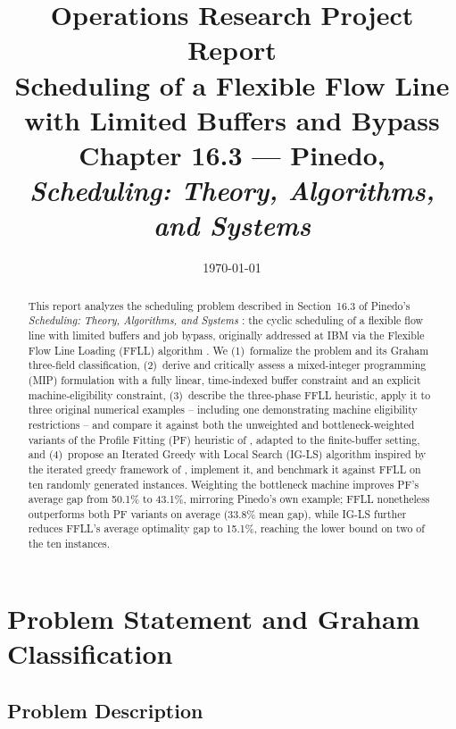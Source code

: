 \documentclass[11pt,a4paper]{article}
\title{\vspace{-1.5cm}
  {\color{steel}\Large Operations Research Project Report}\\[0.4cm]
  {\color{navy}\Huge\bfseries Scheduling of a Flexible Flow Line\\ with Limited Buffers and Bypass}\\[0.3cm]
  {\large Chapter 16.3 --- Pinedo, \textit{Scheduling: Theory, Algorithms, and Systems}}
}
\author{}
\date{\today}
\begin{document}
\maketitle
\thispagestyle{empty}

\begin{abstract}
\noindent
This report analyzes the scheduling problem described in Section~16.3 of
Pinedo's \textit{Scheduling: Theory, Algorithms, and Systems}
\citep{pinedo2016scheduling}: the cyclic scheduling of a flexible flow
line with limited buffers and job bypass, originally addressed at IBM via
the Flexible Flow Line Loading (FFLL) algorithm \citep{ibm_ffll}. We
(1)~formalize the problem and its Graham three-field classification,
(2)~derive and critically assess a mixed-integer programming (MIP)
formulation with a fully linear, time-indexed buffer constraint and an
explicit machine-eligibility constraint, (3)~describe the three-phase
FFLL heuristic, apply it to three original numerical examples -- including
one demonstrating machine eligibility restrictions -- and compare it
against both the unweighted and
bottleneck-weighted variants of the Profile Fitting (PF) heuristic of
\citet{mccormick1989sequencing}, adapted to the finite-buffer setting,
and (4)~propose an Iterated Greedy with Local Search (IG-LS) algorithm
inspired by the iterated greedy framework of \citet{ruiz2007simple},
implement it, and benchmark it against FFLL on ten randomly generated
instances. Weighting the bottleneck machine improves PF's average gap
from 50.1\% to 43.1\%, mirroring Pinedo's own example; FFLL nonetheless
outperforms both PF variants on average (33.8\% mean gap), while IG-LS
further reduces FFLL's average optimality gap to 15.1\%, reaching the
lower bound on two of the ten instances.
\end{abstract}

\vspace{0.5cm}
\tableofcontents
\newpage

\section{Problem Statement and Graham Classification}

\subsection{Problem Description}
\end{document}
